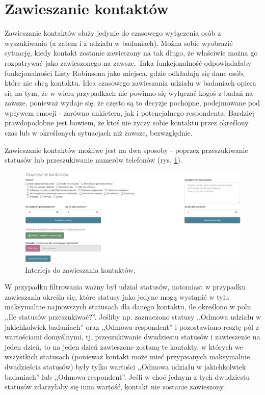 \documentclass[12pt, twoside, hidelinks]{report}
\begin{document}
\section{Zawieszanie kontaktów}
Zawieszanie kontaktów służy jedynie do czasowego wyłączenia osób z wyszukiwania (a zatem i z udziału w badaniach). Można sobie wyobrazić sytuację, kiedy kontakt zostanie zawieszony na tak długo, że właściwie można go rozpatrywać jako zawieszonego na zawsze. Taka funkcjonalność odpowiadałaby funkcjonalności Listy Robinsona jako miejsca, gdzie odkładają się dane osób, które nie chcą kontaktu. Idea czasowego zawieszania udziału w badaniach opiera się na tym, że w wielu przypadkach nie powinno się wyłączać kogoś z badań na zawsze, ponieważ wydaje się, że często są to decyzje pochopne, podejmowane pod wpływem emocji - zarówno ankietera, jak i potencjalnego respondenta. Bardziej prawdopodobne jest bowiem, że ktoś nie życzy sobie kontaktu przez określony czas lub w określonych sytuacjach niż zawsze, bezwzględnie. \par
Zawieszanie kontaktów możliwe jest na dwa sposoby - poprzez przeszukiwanie statusów lub przeszukiwanie numerów telefonów (rys. \ref{zawieszanie_kontaktow_interfejs}). \par
\begin{figure}[h!]
\includegraphics[width = 1\textwidth]{2.3.}
\caption{Interfejs do zawieszania kontaktów.}
\label{zawieszanie_kontaktow_interfejs}
\end{figure}
W przypadku filtrowania ważny był udział statusów, natomiast w przypadku zawieszania określa się, które statusy jako jedyne mogą wystąpić w tylu maksymalnie najnowszych statusach dla danego kontaktu, ile określono w polu ,,Ile statusów przeszukiwać?''. Jeśliby np. zaznaczono statusy ,,Odmowa udziału w jakichkolwiek badaniach'' oraz ,,Odmowa-respondent'' i pozostawiono resztę pól z wartościami domyślnymi, tj. przeszukiwanie dwudziestu statusów i zawieszenie na jeden dzień, to na jeden dzień zawieszone zostaną te kontakty, w których we wszystkich statusach (ponieważ kontakt może mieć przypisanych maksymalnie dwadzieścia statusów) były tylko wartości ,,Odmowa udziału w jakichkolwiek badaniach'' lub ,,Odmowa-respondent''. Jeśli w choć jednym z tych dwudziestu statusów zdarzyłaby się inna wartość, kontakt nie zostanie zawieszony. \par
\end{document}
